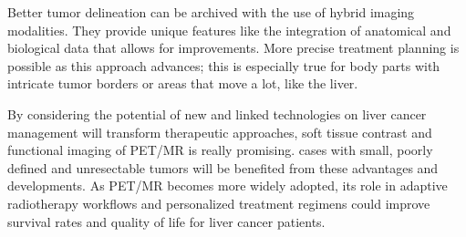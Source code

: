 

Better tumor delineation can be archived with the use of hybrid imaging modalities. They provide unique features like the integration of anatomical and biological data that allows for improvements. More precise treatment planning is possible as this approach advances; this is especially true for body parts with intricate tumor borders or areas that move a lot, like the liver.



By considering the potential of new and linked technologies on liver cancer management will transform therapeutic approaches, soft tissue contrast and functional imaging of PET/MR is really promising. cases with small, poorly defined and unresectable tumors will be benefited from these advantages and developments. As PET/MR becomes more widely adopted, its role in adaptive radiotherapy workflows and personalized treatment regimens could improve survival rates and quality of life for liver cancer patients.